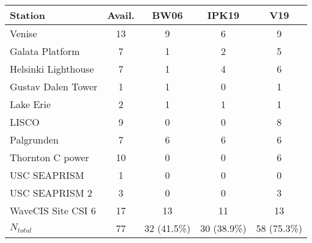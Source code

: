 \documentclass[preview]{standalone}
\begin{document}
\begin{table}
\begin{tabular}{lcccc}\hline

Station 			& Avail.& BW06 	& IPK19 & V19	\\\hline
Venise 				& 13 	& 9 	& 6 	& 9 	\\
Galata Platform 	& 7 	& 1 	& 2 	& 5 	\\
Helsinki Lighthouse & 7 	& 1 	& 4 	& 6 	\\
Gustav Dalen Tower 	& 1 	& 1 	& 0 	& 1 	\\
Lake Erie 			& 2 	& 1 	& 1 	& 1 	\\
LISCO 				& 9 	& 0 	& 0 	& 8 	\\
Palgrunden 			& 7 	& 6 	& 6 	& 6 	\\
Thornton C power 	& 10 	& 0 	& 0 	& 6 	\\
USC SEAPRISM 		& 1 	& 0 	& 0 	& 0 	\\
USC SEAPRISM 2 		& 3 	& 0 	& 0 	& 3 	\\
WaveCIS Site CSI 6 	& 17 	& 13 	& 11 	& 13 	\\\hline
$N_{total}$ 		& 77 	& 32 (41.5\%)	& 30 (38.9\%)	& 58 (75.3\%)	\\

\end{tabular}
\end{table}
\end{document}
